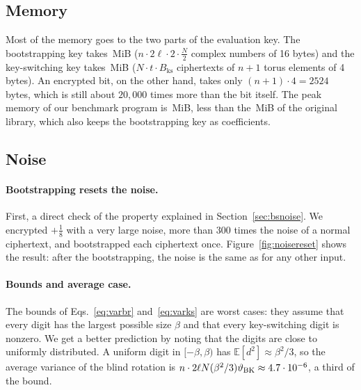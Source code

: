 \documentclass[12pt]{article}
\theoremstyle{plain}
\theoremstyle{definition}
\newcommand{\Bks}{B_{\mathrm{ks}}}
\newcommand{\BK}{\mathrm{BK}}
\begin{document}


\subsection{Memory}

Most of the memory goes to the two parts of the evaluation key. The
bootstrapping key takes \BkMB\,MiB ($n\cdot2\ell\cdot2\cdot\frac N2$ complex numbers
of 16 bytes) and the key-switching key takes \KskMB\,MiB ($N\cdot t\cdot\Bks$
ciphertexts of $n+1$ torus elements of 4 bytes). An encrypted bit, on the other
hand, takes only $(n+1)\cdot4=2524$ bytes, which is still about $20{,}000$ times
more than the bit itself. The peak memory of our benchmark program is
\OurRSS\,MiB, less than the \SpqRSS\,MiB of the original library, which also
keeps the bootstrapping key as coefficients.

\subsection{Noise}
\label{sec:noise}

\paragraph{Bootstrapping resets the noise.}
First, a direct check of the property explained in Section~\ref{sec:bsnoise}.
We encrypted $+\frac18$ with a very large noise, more than $300$ times the noise
of a normal ciphertext, and bootstrapped each ciphertext once.
Figure~\ref{fig:noisereset} shows the result: after the bootstrapping, the
noise is the same as for any other input.



\paragraph{Bounds and average case.}
The bounds of Eqs.~\eqref{eq:varbr} and~\eqref{eq:varks} are worst cases: they
assume that every digit has the largest possible size $\beta$ and that every
key-switching digit is nonzero. We get a better prediction by noting that the
digits are close to uniformly distributed. A uniform digit in $[-\beta,\beta)$
has $\mathbb{E}[d^2]\approx\beta^2/3$, so the average variance of the blind
rotation is $n\cdot2\ell N(\beta^2/3)\vartheta_{\BK}\approx\AvgBR$, a third of the
bound.
\end{document}
